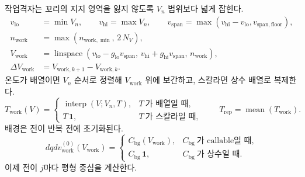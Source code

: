 \documentclass[11pt,a4paper]{article}
\newcommand{\bg}{\mathrm{bg}}
\newcommand{\work}{\mathrm{work}}
\begin{document}
작업격자는 꼬리의 지지 영역을 잃지 않도록 $V_n$ 범위보다 넓게 잡힌다.
\begin{align}
v_{\mathrm{lo}}&=\min V_n,\qquad v_{\mathrm{hi}}=\max V_n,\qquad
v_{\mathrm{span}}=\max(v_{\mathrm{hi}}-v_{\mathrm{lo}},v_{\mathrm{span,floor}}),\label{eq:vspan}\\
n_{\work}&=\max(n_{\work,\min},\,2\,N_V),\label{eq:nwork}\\
V_{\work}&=\operatorname{linspace}\!\left(v_{\mathrm{lo}}-g_{\mathrm{lo}}v_{\mathrm{span}},\,
v_{\mathrm{hi}}+g_{\mathrm{hi}}v_{\mathrm{span}},\,n_{\work}\right),\label{eq:vwork}\\
\Delta V_{\work}&=V_{\work,k+1}-V_{\work,k}.
\label{eq:gridstep}
\end{align}
온도가 배열이면 $V_n$ 순서로 정렬해 $V_{\work}$ 위에 보간하고, 스칼라면 상수 배열로 복제한다.
\begin{equation}
T_{\work}(V)=
\begin{cases}
\operatorname{interp}(V;V_n,T),&T\ \text{가 배열일 때},\\
T\,\mathbf 1,&T\ \text{가 스칼라일 때},
\end{cases}
\qquad
T_{\mathrm{rep}}=\operatorname{mean}(T_{\work}).
\label{eq:Twork}
\end{equation}
배경은 전이 반복 전에 초기화된다.
\begin{equation}
dqdv_{\work}^{(0)}(V_{\work})=
\begin{cases}
C_{\bg}(V_{\work}),&C_{\bg}\ \text{가 callable일 때},\\
C_{\bg}\,\mathbf 1,&C_{\bg}\ \text{가 상수일 때}.
\end{cases}
\label{eq:Cbginit}
\end{equation}
이제 전이 $j$마다 평형 중심을 계산한다.

\end{document}
